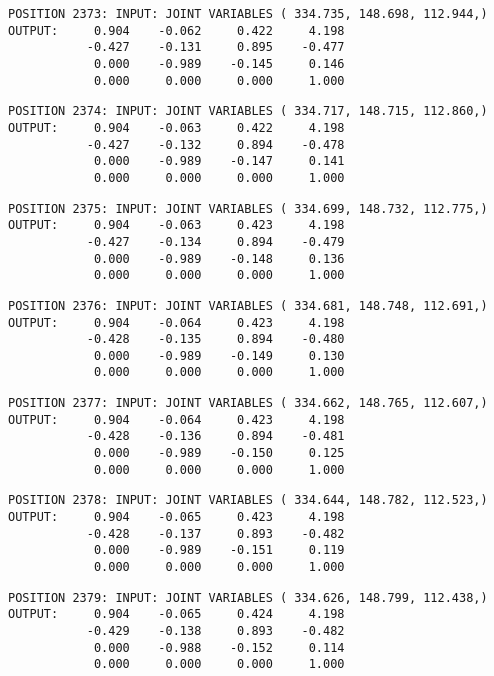 \begin{verbatim}
POSITION 2373: INPUT: JOINT VARIABLES ( 334.735, 148.698, 112.944,)
OUTPUT:     0.904    -0.062     0.422     4.198
           -0.427    -0.131     0.895    -0.477
            0.000    -0.989    -0.145     0.146
            0.000     0.000     0.000     1.000
\end{verbatim} \pagebreak[1]\begin{verbatim}
POSITION 2374: INPUT: JOINT VARIABLES ( 334.717, 148.715, 112.860,)
OUTPUT:     0.904    -0.063     0.422     4.198
           -0.427    -0.132     0.894    -0.478
            0.000    -0.989    -0.147     0.141
            0.000     0.000     0.000     1.000
\end{verbatim} \pagebreak[1]\begin{verbatim}
POSITION 2375: INPUT: JOINT VARIABLES ( 334.699, 148.732, 112.775,)
OUTPUT:     0.904    -0.063     0.423     4.198
           -0.427    -0.134     0.894    -0.479
            0.000    -0.989    -0.148     0.136
            0.000     0.000     0.000     1.000
\end{verbatim} \pagebreak[1]\begin{verbatim}
POSITION 2376: INPUT: JOINT VARIABLES ( 334.681, 148.748, 112.691,)
OUTPUT:     0.904    -0.064     0.423     4.198
           -0.428    -0.135     0.894    -0.480
            0.000    -0.989    -0.149     0.130
            0.000     0.000     0.000     1.000
\end{verbatim} \pagebreak[1]\begin{verbatim}
POSITION 2377: INPUT: JOINT VARIABLES ( 334.662, 148.765, 112.607,)
OUTPUT:     0.904    -0.064     0.423     4.198
           -0.428    -0.136     0.894    -0.481
            0.000    -0.989    -0.150     0.125
            0.000     0.000     0.000     1.000
\end{verbatim} \pagebreak[1]\begin{verbatim}
POSITION 2378: INPUT: JOINT VARIABLES ( 334.644, 148.782, 112.523,)
OUTPUT:     0.904    -0.065     0.423     4.198
           -0.428    -0.137     0.893    -0.482
            0.000    -0.989    -0.151     0.119
            0.000     0.000     0.000     1.000
\end{verbatim} \pagebreak[1]\begin{verbatim}
POSITION 2379: INPUT: JOINT VARIABLES ( 334.626, 148.799, 112.438,)
OUTPUT:     0.904    -0.065     0.424     4.198
           -0.429    -0.138     0.893    -0.482
            0.000    -0.988    -0.152     0.114
            0.000     0.000     0.000     1.000
\end{verbatim} \pagebreak[1]\begin{verbatim}

\end{verbatim}
